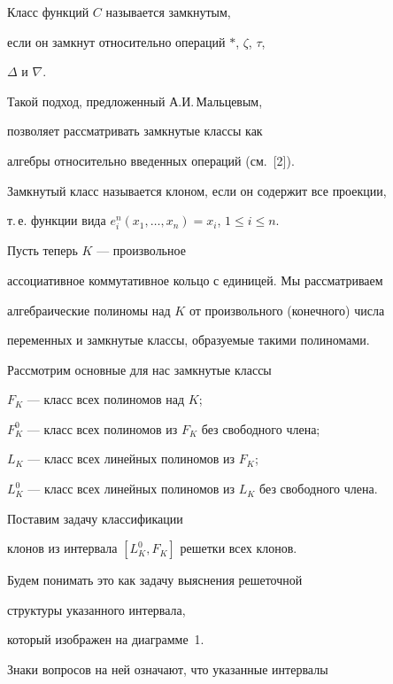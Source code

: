 Класс функций $C$ называется замкнутым, 


если он замкнут относительно операций $*$, $\zeta$, $\tau$, 


$\Delta$ и $\nabla$. 


Такой подход, предложенный А.И.\,Мальцевым, 


позволяет рассматривать замкнутые классы как


алгебры относительно введенных операций (см.~[2]).


Замкнутый класс называется клоном, если он содержит все проекции,


т.\,е. функции вида $e^n_i(x_1,\dotsc,x_n)=x_i$, $1\le i\le n$.





Пусть теперь $K$ --- произвольное 


ассоциативное коммутативное кольцо с единицей. Мы рассматриваем


алгебраические полиномы над $K$ от произвольного (конечного) числа


переменных и замкнутые классы, образуемые такими полиномами.


Рассмотрим основные для нас замкнутые классы





$F_K$ --- класс всех полиномов над $K$;





$F^0_K$ --- класс всех полиномов из $F_K$ без свободного члена;





$L_K$ --- класс всех линейных полиномов из $F_K$;





$L^0_K$ --- класс всех линейных полиномов из $L_K$ без свободного члена.





Поставим задачу классификации 


клонов из интервала $[{L^0_K}, {F_K}]$ решетки всех клонов.


Будем понимать это как задачу выяснения решеточной


структуры указанного интервала, 


который изображен на диаграмме~1.


Знаки вопросов на ней означают, что указанные интервалы 



